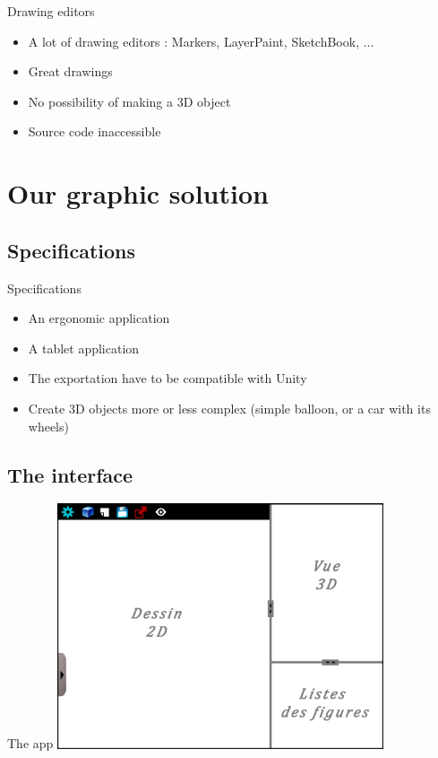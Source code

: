 \documentclass[a4paper,10pt]{beamer}
\begin{document}
			\begin{frame}{Drawing editors}
				\begin{itemize}
					\item A lot of drawing editors : Markers, LayerPaint, SketchBook, ...
					\item Great drawings
					\item No possibility of making a 3D object
					\item Source code inaccessible
				\end{itemize}
			\end{frame}
	
	\section{Our graphic solution}
		\subsection{Specifications}
		
		\begin{frame}{Specifications}
			\begin{itemize}
				\item An ergonomic application
				\item A tablet application
				\item The exportation have to be compatible with Unity
				\item Create 3D objects more or less complex (simple balloon, or a car with its wheels)
			\end{itemize}
		\end{frame}
		
		\subsection{The interface}
		
			\begin{frame}{The app}
				\includegraphics[height=205pt]{images/AppliMenuFerme.png}
			\end{frame}
			
\end{document}
